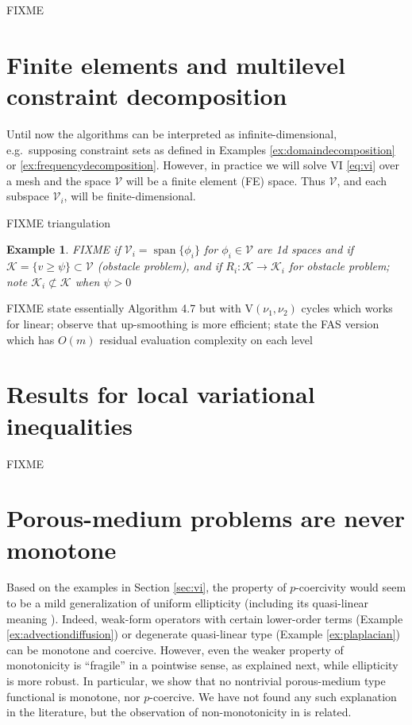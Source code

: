 \documentclass[letterpaper,final,12pt,reqno]{amsart}
\theoremstyle{cstyle}
\theoremstyle{cstyle*}
\theoremstyle{dstyle}
\newtheorem{example}[theorem]{Example}
\numberwithin{equation}{section}
\numberwithin{figure}{section}
\numberwithin{table}{section}
\numberwithin{theorem}{section}
\newcommand{\cK}{\mathcal{K}}
\newcommand{\cV}{\mathcal{V}}
\newcommand{\Span}{\operatorname{span}}
\begin{document}
FIXME

\section{Finite elements and multilevel constraint decomposition} \label{sec:multilevel}

Until now the algorithms can be interpreted as infinite-dimensional, e.g.~supposing constraint sets as defined in Examples \ref{ex:domaindecomposition} or \ref{ex:frequencydecomposition}.  However, in practice we will solve VI \eqref{eq:vi} over a mesh and the space $\cV$ will be a finite element (FE) space.  Thus $\cV$, and each subspace $\cV_i$, will be finite-dimensional.

FIXME triangulation

\begin{example}  FIXME if $\cV_i=\Span\{\phi_i\}$ for $\phi_i\in\cV$ are 1d spaces and if $\cK = \{v \ge \psi\} \subset \cV$ (obstacle problem), and if $R_i : \cK \to \cK_i$ for obstacle problem; note $\cK_i \not\subset \cK$ when $\psi>0$
\end{example}

FIXME state essentially Algorithm 4.7 \cite{GraeserKornhuber2009} but with $\text{V}(\nu_1,\nu_2)$ cycles which works for linear; observe that up-smoothing is more efficient; state the FAS version which has $O(m)$ residual evaluation complexity on each level


\section{Results for local variational inequalities} \label{sec:results}

FIXME





\small



\normalsize
\appendix

\section{Porous-medium problems are never monotone}

Based on the examples in Section \ref{sec:vi}, the property of $p$-coercivity would seem to be a mild generalization of uniform ellipticity (including its quasi-linear meaning \cite[Section 8.3]{Evans2010}).  Indeed, weak-form operators with certain lower-order terms (Example \ref{ex:advectiondiffusion}) or degenerate quasi-linear type (Example \ref{ex:plaplacian}) can be monotone and coercive.  However, even the weaker property of monotonicity is ``fragile'' in a pointwise sense, as explained next, while ellipticity is more robust.  In particular, we show that no nontrivial porous-medium type functional is monotone, nor $p$-coercive.  We have not found any such explanation in the literature, but the observation of non-monotonicity in \cite{RocknerWang2008} is related.
\end{document}
